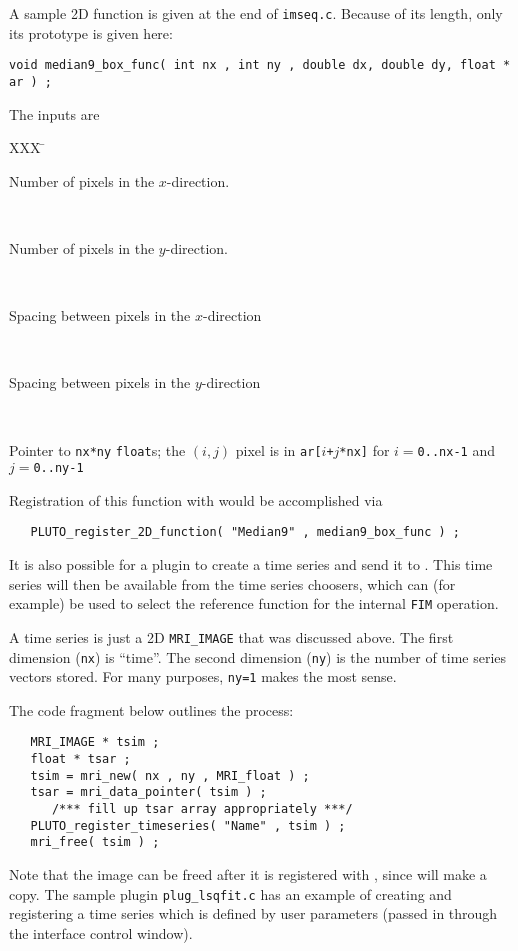 A sample 2D function is given at the end of {\tt imseq.c}.
Because of its length, only its prototype is given here:
\begin{samepage}\begin{verbatim}
void median9_box_func( int nx , int ny , double dx, double dy, float * ar ) ;
\end{verbatim}\end{samepage}
The inputs are
\begin{tabbing}
  \blob XXX \= \kill
%
   \> \parbox[t]{5.8in}{Number of pixels in the $x$-direction.}\\[.9ex]
%
   \> \parbox[t]{5.8in}{Number of pixels in the $y$-direction.}\\[.9ex]
%
   \> \parbox[t]{5.8in}{Spacing between pixels in the $x$-direction}\\[.9ex]
%
   \> \parbox[t]{5.8in}{Spacing between pixels in the $y$-direction}\\[.9ex]
%
   \> \parbox[t]{5.8in}{Pointer to {\tt nx*ny} {\tt float}s; the
                                     $(i,j)$ pixel is in {\tt ar[$i$+$j$*nx]}
                                     for $i={}${\tt 0..nx-1} and $j={}${\tt 0..ny-1}}
\end{tabbing}
Registration of this function with \afnit would be accomplished via
\begin{verbatim}
   PLUTO_register_2D_function( "Median9" , median9_box_func ) ;
\end{verbatim}

It is also possible for a plugin to create a time series and send it
to \afni.  This time series will then be available from the time series
choosers, which can (for example) be used to select the reference function
for the \afnit internal {\tt FIM} operation.

A time series is just a 2D {\tt MRI\_IMAGE} that was discussed above.
The first dimension ({\tt nx}) is ``time''.  The second dimension
({\tt ny}) is the number of time series vectors stored.  For many purposes,
{\tt ny=1} makes the most sense.

The code fragment below outlines the process:
\begin{samepage}\begin{verbatim}
   MRI_IMAGE * tsim ;
   float * tsar ;
   tsim = mri_new( nx , ny , MRI_float ) ;
   tsar = mri_data_pointer( tsim ) ;
      /*** fill up tsar array appropriately ***/
   PLUTO_register_timeseries( "Name" , tsim ) ;
   mri_free( tsim ) ;
\end{verbatim}\end{samepage}
Note that the image can be freed after it is registered with \afni, since
\afnit will make a copy.
The sample plugin {\tt plug\_lsqfit.c} has an example of creating
and registering a time series which is defined by user parameters
(passed in through the interface control window).

